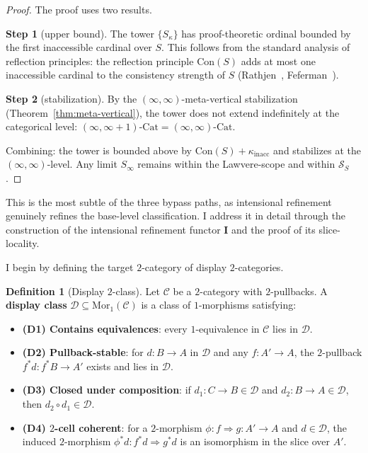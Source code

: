 \documentclass[11pt]{article}
\theoremstyle{plain}
\theoremstyle{definition}
\newtheorem{definition}[theorem]{Definition}
\newcommand{\cS}{\mathcal{S}}
\newcommand{\cC}{\mathcal{C}}
\newcommand{\cD}{\mathcal{D}}
\newcommand{\Mor}{\mathrm{Mor}}
\newcommand{\Cat}{\mathrm{Cat}}
\newcommand{\Con}{\mathrm{Con}}
\newcommand{\II}{\mathbf{I}}
\begin{document}
\begin{proof}
The proof uses two results.

\textbf{Step 1} (upper bound). The tower $\{S_\kappa\}$ has proof-theoretic ordinal bounded by the first inaccessible cardinal over $S$. This follows from the standard analysis of reflection principles: the reflection principle $\Con(S)$ adds at most one inaccessible cardinal to the consistency strength of $S$ (Rathjen~\cite{Rathjen1999}, Feferman~\cite{Feferman1964}).

\textbf{Step 2} (stabilization). By the $(\infty, \infty)$-meta-vertical stabilization (Theorem~\ref{thm:meta-vertical}), the tower does not extend indefinitely at the categorical level: $(\infty, \infty + 1)\text{-}\Cat = (\infty, \infty)\text{-}\Cat$.

Combining: the tower is bounded above by $\Con(S) + \kappa_{\mathrm{inacc}}$ and stabilizes at the $(\infty, \infty)$-level. Any limit $S_\infty$ remains within the Lawvere-scope and within $\cS_S$.
\end{proof}

This is the most subtle of the three bypass paths, as intensional refinement genuinely refines the base-level classification. I address it in detail through the construction of the intensional refinement functor $\II$ and the proof of its slice-locality.

I begin by defining the target $2$-category of display $2$-categories.

\begin{definition}[Display $2$-class]\label{def:display-class}
Let $\cC$ be a $2$-category with $2$-pullbacks. A \textbf{display class} $\cD \subseteq \Mor_1(\cC)$ is a class of $1$-morphisms satisfying:
\begin{itemize}
\item \textbf{(D1) Contains equivalences}: every $1$-equivalence in $\cC$ lies in $\cD$.
\item \textbf{(D2) Pullback-stable}: for $d : B \to A$ in $\cD$ and any $f : A' \to A$, the $2$-pullback $f^*d : f^*B \to A'$ exists and lies in $\cD$.
\item \textbf{(D3) Closed under composition}: if $d_1 : C \to B \in \cD$ and $d_2 : B \to A \in \cD$, then $d_2 \circ d_1 \in \cD$.
\item \textbf{(D4) $2$-cell coherent}: for a $2$-morphism $\phi : f \Rightarrow g : A' \to A$ and $d \in \cD$, the induced $2$-morphism $\phi^* d : f^* d \Rightarrow g^* d$ is an isomorphism in the slice over $A'$.
\end{itemize}
\end{definition}
\end{document}
